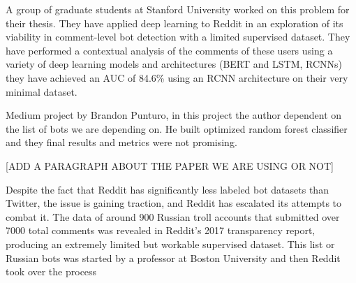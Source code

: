 \documentclass{article}
\begin{document}
     A group of graduate students at Stanford University worked on this problem for their thesis. They have applied deep learning to Reddit in an exploration of its viability in comment-level bot detection with a limited supervised dataset. They have performed a contextual analysis of the comments of these users using a variety of deep learning models and architectures (BERT and LSTM, RCNNs) they have achieved an AUC of 84.6\% using an RCNN architecture on their very minimal dataset.\par
     
     Medium project by Brandon Punturo, in this project the author dependent on the list of bots we are depending on. He built optimized random forest classifier and they final results and metrics were not promising.\par
     
     [ADD A PARAGRAPH ABOUT THE PAPER WE ARE USING OR NOT]
     
     Despite the fact that Reddit has significantly less labeled bot datasets than Twitter, the issue is gaining traction, and Reddit has escalated its attempts to combat it. The data of around 900 Russian troll accounts that submitted over 7000 total comments was revealed in Reddit's 2017 transparency report, producing an extremely limited but workable supervised dataset. This list or Russian bots was started by a professor at Boston University and then Reddit took over the process \par
     
     

    
\end{document}
